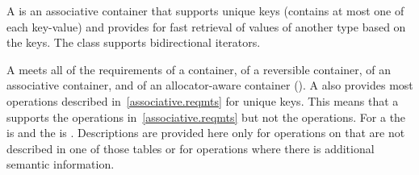 \documentclass{wg21}
\begin{document}
%
\pnum
A  is an associative container that
supports unique keys (contains at most one of each key-value) and
provides for fast retrieval of values of another type  based
on the keys. The  class supports bidirectional iterators.

\pnum
A
meets all of the requirements of a container, of a reversible container, of
an associative container, and of an allocator-aware container ().
A
also provides most operations described in~\ref{associative.reqmts}
for unique keys.
This means that a
supports the
operations in~\ref{associative.reqmts}
but not the
operations.
For a
the
is
and the
is
.
Descriptions are provided here only for operations on
that are not described in one of those tables
or for operations where there is additional semantic information.
\end{document}
